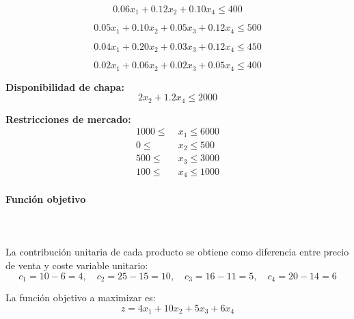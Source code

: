 \begin{equation}
0.06x_1 + 0.12x_2 + 0.10x_4 \leq 400
\end{equation}

\begin{equation}
0.05x_1 + 0.10x_2 + 0.05x_3 + 0.12x_4 \leq 500
\end{equation}

\begin{equation}
0.04x_1 + 0.20x_2 + 0.03x_3 + 0.12x_4 \leq 450
\end{equation}

\begin{equation}
0.02x_1 + 0.06x_2 + 0.02x_3 + 0.05x_4 \leq 400
\end{equation}

\noindent
\textbf{Disponibilidad de chapa:}
\begin{equation}
2x_2 + 1.2x_4 \leq 2000
\end{equation}

\noindent
\textbf{Restricciones de mercado:}
\begin{align}
1000 \leq & \; x_1 \leq 6000 \\
0 \leq & \; x_2 \leq 500 \\
500 \leq & \; x_3 \leq 3000 \\
100 \leq & \; x_4 \leq 1000
\end{align}

\paragraph{Función objetivo}\mbox{}\\
\\
La contribución unitaria de cada producto se obtiene como diferencia entre precio de venta y coste variable unitario:
\[
c_1 = 10 - 6 = 4, \quad
c_2 = 25 - 15 = 10, \quad
c_3 = 16 - 11 = 5, \quad
c_4 = 20 - 14 = 6
\]

La función objetivo a maximizar es:
\begin{equation}
z = 4x_1 + 10x_2 + 5x_3 + 6x_4
\end{equation}

